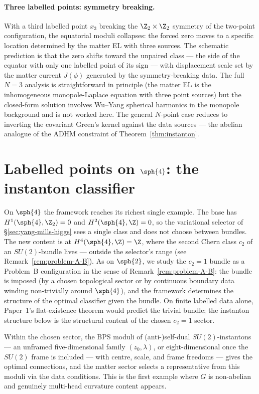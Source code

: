 \paragraph{Three labelled points: symmetry breaking.} With a third
labelled point $x_3$ breaking the $\Z_2\times\Z_2$ symmetry of the
two-point configuration, the equatorial moduli collapses: the
forced zero moves to a specific location determined by the matter
EL with three sources. The schematic prediction is that the zero
shifts toward the unpaired class --- the side of the equator with
only one labelled point of its sign --- with displacement scale set
by the matter current $J(\phi)$ generated by the symmetry-breaking
data. The full $N=3$ analysis is straightforward in principle (the
matter EL is the inhomogeneous monopole-Laplace equation with three
point sources) but the closed-form solution involves
Wu--Yang spherical harmonics in the monopole background and is not
worked here. The general $N$-point case reduces to inverting the
covariant Green's kernel against the data sources --- the abelian
analogue of the ADHM constraint of Theorem~\ref{thm:instanton}.

\section{Labelled points on $\sph{4}$: the instanton classifier}
\label{sec:S4-instanton}

On $\sph{4}$ the framework reaches its richest single example. The
base has $H^1(\sph{4},\Z_2)=0$ and $H^2(\sph{4},\Z)=0$, so the
variational selector of \S\ref{sec:yang-mills-higgs} sees a single
class and does not choose between bundles. The new content is at
$H^4(\sph{4},\Z)=\Z$, where the second Chern class $c_2$ of an
$SU(2)$-bundle lives --- outside the selector's range (see
Remark~\ref{rem:problem-A-B}). As on $\sph{2}$, we study the
$c_2=1$ bundle as a Problem~B configuration in the sense of
Remark~\ref{rem:problem-A-B}: the bundle is imposed (by a chosen
topological sector or by continuous boundary data winding non-trivially
around $\sph{4}$), and the framework determines the structure of
the optimal classifier given the bundle. On finite labelled data
alone, Paper~1's flat-existence theorem would predict the trivial
bundle; the instanton structure below is the structural content of
the chosen $c_2=1$ sector.

Within the chosen sector, the BPS moduli of (anti-)self-dual
$SU(2)$-instantons --- an unframed five-dimensional family
$(z_0,\lambda)$, or eight-dimensional once the $SU(2)$ frame is
included --- with centre, scale,
and frame freedoms --- gives the optimal connections, and the matter
sector selects a representative from this moduli via the data
conditions. This is the first example where $G$ is non-abelian and
genuinely multi-head curvature content appears.

